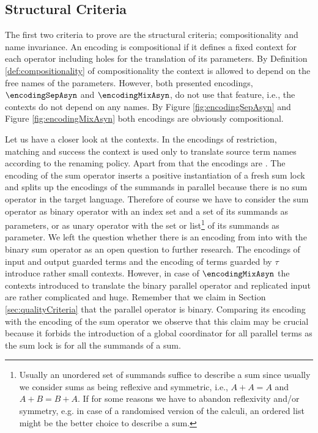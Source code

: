 \documentclass[]{llncs}
\begin{document}
\subsection{Structural Criteria} \label{sec:structuralCriteria}

The first two criteria to prove are the structural criteria; compositionality and name invariance. An encoding is compositional if it defines a fixed context for each operator including holes for the translation of its parameters. By Definition \ref{def:compositionality} of compositionality the context is allowed to depend on the free names of the parameters. However, both presented encodings, $ \encodingSepAsyn $ and $ \encodingMixAsyn $, do not use that feature, i.e., the contexts do not depend on any names. By Figure \ref{fig:encodingSepAsyn} and Figure \ref{fig:encodingMixAsyn} both encodings are obviously compositional.

Let us have a closer look at the contexts. In the encodings of restriction, matching and success the context is used only to translate source term names according to the renaming policy. Apart from that the encodings are \clean. The encoding of the sum operator inserts a positive instantiation of a fresh sum lock and splits up the encodings of the summands in parallel because there is no sum operator in the target language. Therefore of course we have to consider the sum operator as binary operator with an index set and a set of its summands as parameters, or as unary operator with the set or list\footnote{Usually an unordered set of summands suffice to describe a sum since usually we consider sums as being reflexive and symmetric, i.e., $ A + A = A $ and $ A + B = B + A $. If for some reasons we have to abandon reflexivity and/or symmetry, e.g. in case of a randomised version of the calculi, an ordered list might be the better choice to describe a sum.} of its summands as parameter. We left the question whether there is an encoding from \piMix into \piAsyn with the binary sum operator as an open question to further research. The encodings of input and output guarded terms and the encoding of terms guarded by $ \tau $ introduce rather small contexts. However, in case of $ \encodingMixAsyn $ the contexts introduced to translate the binary parallel operator and replicated input are rather complicated and huge. Remember that we claim in Section \ref{sec:qualityCriteria} that the parallel operator is binary. Comparing its encoding with the encoding of the sum operator we observe that this claim may be crucial because it forbids the introduction of a global coordinator for all parallel terms as the sum lock is for all the summands of a sum.
\end{document}
